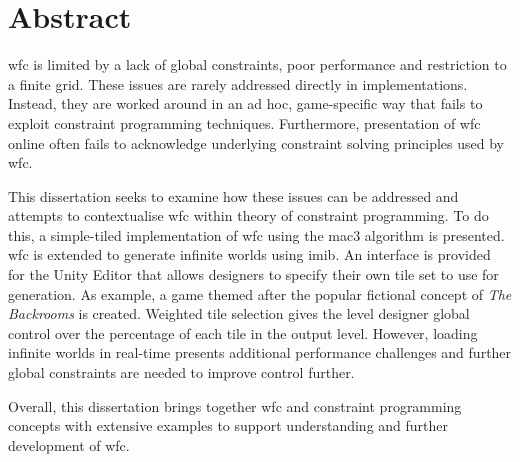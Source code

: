 \section*{Abstract}
\acrfull{wfc} is limited by a lack of global constraints, poor performance and restriction to a finite grid. These issues are rarely addressed directly in implementations. Instead, they are worked around in an ad hoc, game-specific way that fails to exploit constraint programming techniques. Furthermore, presentation of \acrshort{wfc} online often fails to acknowledge underlying constraint solving principles used by \acrshort{wfc}.

This dissertation seeks to examine how these issues can be addressed and attempts to contextualise \acrshort{wfc} within theory of constraint programming. To do this, a simple-tiled implementation of \acrshort{wfc} using the \acrfull{mac3} algorithm is presented. \acrshort{wfc} is extended to generate infinite worlds using \acrfull{imib}. An interface is provided for the Unity Editor that allows designers to specify their own tile set to use for generation. As example, a game themed after the popular fictional concept of \textit{The Backrooms} is created. Weighted tile selection gives the level designer global control over the percentage of each tile in the output level. However, loading infinite worlds in real-time presents additional performance challenges and further global constraints are needed to improve control further.

Overall, this dissertation brings together \acrshort{wfc} and constraint programming concepts with extensive examples to support understanding and further development of \acrshort{wfc}.


